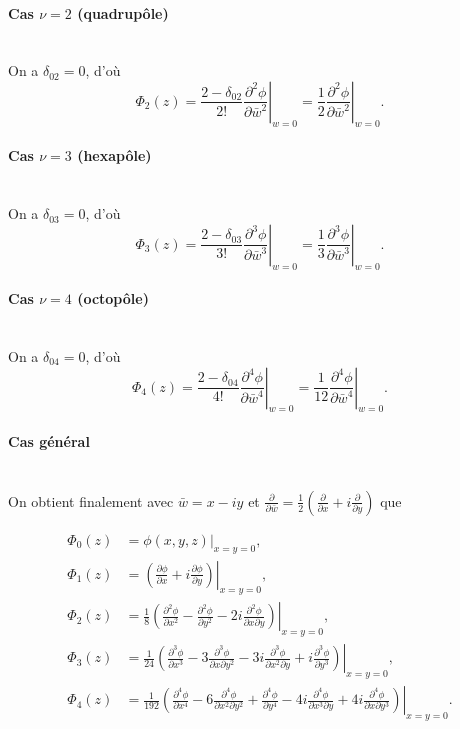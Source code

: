 \documentclass{article}
\begin{document}
\paragraph{Cas \(\nu = 2\) (quadrupôle)}
\
\\
On a \(\delta_{02} = 0\), d'où
\[
\Phi_2(z) = \frac{2 - \delta_{02}}{2!} \left. \frac{\partial^{2} \phi}{\partial \bar{w}^{2}} \right|_{w=0} = \frac{1}{2} \left. \frac{\partial^{2} \phi}{\partial \bar{w}^{2}} \right|_{w=0}.
\]

\paragraph{Cas \(\nu = 3\) (hexapôle)}
\
\\
On a \(\delta_{03} = 0\), d'où
\[
\Phi_3(z) = \frac{2 - \delta_{03}}{3!} \left. \frac{\partial^{3} \phi}{\partial \bar{w}^{3}} \right|_{w=0} = \frac{1}{3} \left. \frac{\partial^{3} \phi}{\partial \bar{w}^{3}} \right|_{w=0}.
\]

\paragraph{Cas \(\nu = 4\) (octopôle)}
\
\\
On a \(\delta_{04} = 0\), d'où
\[
\Phi_4(z) = \frac{2 - \delta_{04}}{4!} \left. \frac{\partial^{4} \phi}{\partial \bar{w}^{4}} \right|_{w=0} = \frac{1}{12} \left. \frac{\partial^{4} \phi}{\partial \bar{w}^{4}} \right|_{w=0}.
\]

\paragraph{Cas général}
\
\\
On obtient finalement avec \(\bar{w} = x - iy\) et \(\frac{\partial}{\partial \bar{w}} = \frac{1}{2}\left(\frac{\partial}{\partial x} + i\frac{\partial}{\partial y}\right)\) que

\[
\begin{aligned}
\Phi_0(z) &= \phi(x, y, z)\big|_{x=y=0}, \\[0.4em]
\Phi_1(z) &= \left. \left( \frac{\partial \phi}{\partial x} + i \frac{\partial \phi}{\partial y} \right) \right|_{x=y=0}, \\[0.6em]
\Phi_2(z) &= \left. \frac{1}{8} \left( \frac{\partial^{2} \phi}{\partial x^{2}} - \frac{\partial^{2} \phi}{\partial y^{2}} - 2i \frac{\partial^{2} \phi}{\partial x \partial y} \right) \right|_{x=y=0}, \\[0.6em]
\Phi_3(z) &= \left. \frac{1}{24} \left( \frac{\partial^{3} \phi}{\partial x^{3}} - 3 \frac{\partial^{3} \phi}{\partial x \partial y^{2}} - 3i \frac{\partial^{3} \phi}{\partial x^{2} \partial y} + i \frac{\partial^{3} \phi}{\partial y^{3}} \right) \right|_{x=y=0}, \\[0.6em]
\Phi_4(z) &= \left. \frac{1}{192} \left( \frac{\partial^{4} \phi}{\partial x^{4}} - 6 \frac{\partial^{4} \phi}{\partial x^{2} \partial y^{2}} + \frac{\partial^{4} \phi}{\partial y^{4}} - 4i \frac{\partial^{4} \phi}{\partial x^{3} \partial y} + 4i \frac{\partial^{4} \phi}{\partial x \partial y^{3}} \right) \right|_{x=y=0}.
\end{aligned}
\]
\end{document}
